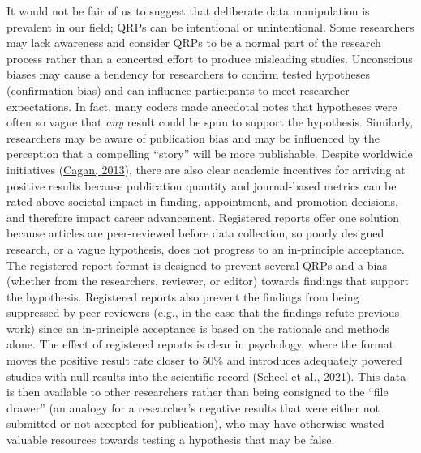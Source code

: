 \documentclass[]{cik}%
\begin{document}
It would not be fair of us to suggest that deliberate data manipulation
is prevalent in our field; QRPs can be intentional or unintentional.
Some researchers may lack awareness and consider QRPs to be a normal
part of the research process rather than a concerted effort to produce
misleading studies. Unconscious biases may cause a tendency for
researchers to confirm tested hypotheses (confirmation bias) and can
influence participants to meet researcher expectations. In fact, many
coders made anecdotal notes that hypotheses were often so vague that
\emph{any} result could be spun to support the hypothesis. Similarly,
researchers may be aware of publication bias and may be influenced by
the perception that a compelling ``story'' will be more publishable.
Despite worldwide initiatives (\protect\hyperlink{ref-DORA2013}{Cagan,
2013}), there are also clear academic incentives for arriving at
positive results because publication quantity and journal-based metrics
can be rated above societal impact in funding, appointment, and
promotion decisions, and therefore impact career advancement. Registered
reports offer one solution because articles are peer-reviewed before
data collection, so poorly designed research, or a vague hypothesis,
does not progress to an in-principle acceptance. The registered report
format is designed to prevent several QRPs and a bias (whether from the
researchers, reviewer, or editor) towards findings that support the
hypothesis. Registered reports also prevent the findings from being
suppressed by peer reviewers (e.g., in the case that the findings refute
previous work) since an in-principle acceptance is based on the
rationale and methods alone. The effect of registered reports is clear
in psychology, where the format moves the positive result rate closer to
50\% and introduces adequately powered studies with null results into
the scientific record (\protect\hyperlink{ref-scheel_excess_2020}{Scheel
et al., 2021}). This data is then available to other researchers rather
than being consigned to the ``file drawer'' (an analogy for a
researcher's negative results that were either not submitted or not
accepted for publication), who may have otherwise wasted valuable
resources towards testing a hypothesis that may be false.
\end{document}
